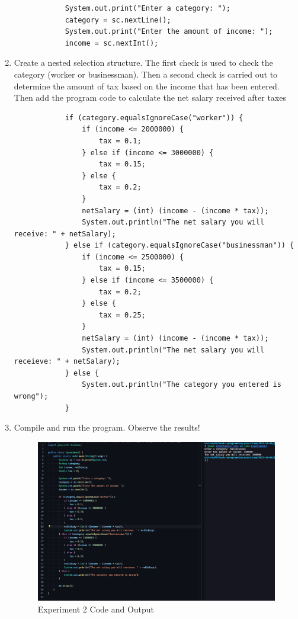 \documentclass[12pt,titlepage]{article}
\begin{document}
\begin{enumerate}
{        \begin{verbatim}
            System.out.print("Enter a category: ");
            category = sc.nextLine();
            System.out.print("Enter the amount of income: ");
            income = sc.nextInt();
        \end{verbatim}
    }
    \item {
        Create a nested selection structure. The first check is used to check the category (worker
        or businessman). Then a second check is carried out to determine the amount of tax
        based on the income that has been entered. Then add the program code to calculate the
        net salary received after taxes

        \begin{verbatim}
            if (category.equalsIgnoreCase("worker")) {
                if (income <= 2000000) {
                    tax = 0.1;
                } else if (income <= 3000000) {
                    tax = 0.15;
                } else {
                    tax = 0.2;
                }
                netSalary = (int) (income - (income * tax));
                System.out.println("The net salary you will receive: " + netSalary);
            } else if (category.equalsIgnoreCase("businessman")) {
                if (income <= 2500000) {
                    tax = 0.15;
                } else if (income <= 3500000) {
                    tax = 0.2;
                } else {
                    tax = 0.25;
                }
                netSalary = (int) (income - (income * tax));
                System.out.println("The net salary you will receieve: " + netSalary);
            } else {
                System.out.println("The category you entered is wrong");
            }
        \end{verbatim}
    }
    \pagebreak
    \item {
        Compile and run the program. Observe the results!

        \begin{figure}[h]
            \centering
            \includegraphics[width=\textwidth]{images/experiment2.png}
            \caption{Experiment 2 Code and Output}
        \end{figure}
    }
\end{enumerate}
\end{document}
